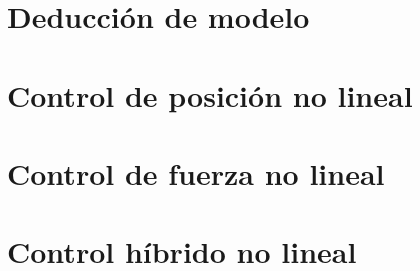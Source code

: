 




\setmainfont{AvenirLTStd-Roman}



\setmainfont{Calibri}


\tableofcontents
\newpage


\section{Deducción de modelo}


\section{Control de posición no lineal}


\section{Control de fuerza no lineal}


\section{Control híbrido no lineal}


%


